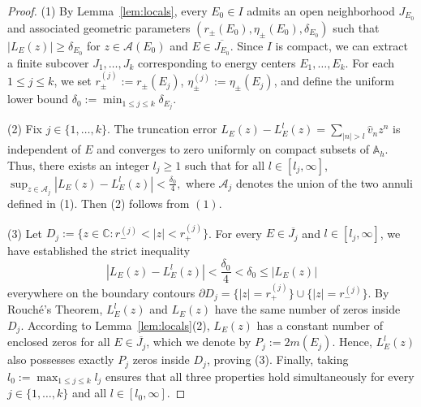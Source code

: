\documentclass[reqno,11pt]{amsart}
\begin{document}
\begin{proof}
(1) By Lemma~\ref{lem:locals}, every $E_0 \in I$ admits an open neighborhood $J_{E_0}$ and associated geometric parameters $(r_\pm(E_0), \eta_\pm(E_0), \delta_{E_0})$ such that $|L_{E}^{}(z)| \ge \delta_{E_0}$ for $z\in \mathcal A(E_0)$ and $E \in \overline{J_{E_0}}$. 
Since $I$ is compact, we can extract a finite subcover $J_1, \dots, J_k$ corresponding to energy centers $E_1, \dots, E_k$. For each $1 \le j \le k$, we set $r_\pm^{(j)} := r_\pm(E_j)$, $\eta_\pm^{(j)} := \eta_\pm(E_j)$, and define the uniform lower bound $\delta_0 := \min_{1 \le j \le k}\delta_{E_j}$. 

(2) Fix $j \in \{1,\dots,k\}$. The truncation error $L_{E}^{}(z) - L^{l}_E(z) = \sum_{|n|>l} \hat{v}_n z^n$ is  independent of $E$ and converges to zero uniformly on compact subsets of $\mathbb{A}_h$. Thus, there exists an integer $l_j \ge 1$ such that for all $l \in[l_j,\infty]$, 
$
\sup_{z \in \mathcal{A}_j} |L_{E}^{}(z) - L^{l}_{E}(z)| < \frac{\delta_0}{4},
$
where $\mathcal{A}_j$ denotes the union of the two annuli defined in (1). 
Then (2) follows  from $(1)$.


(3) Let $D_j := \{z \in \mathbb{C} : r_-^{(j)} < |z| < r_+^{(j)}\}$. For every $E \in \overline{J_j}$ and $l \in [l_j,\infty]$, we have established the strict inequality
$$
|L_{E}^{}(z) - L^{l}_{E}(z)| < \frac{\delta_0}{4} < \delta_0 \le |L_{E}^{}(z)|
$$
everywhere on the boundary contours $\partial D_j = \{|z|=r_+^{(j)}\} \cup \{|z|=r_-^{(j)}\}$. By Rouché's Theorem, $L^{l}_{E}(z)$ and $L_{E}^{}(z)$  have  the same number of zeros inside $D_j$. According to Lemma~\ref{lem:locals}(2), $L_{E}^{}(z)$ has a constant number of enclosed zeros for all $E \in \overline{J_j}$, which we denote by $P_j := 2m(E_j)$. Hence, $L^{l}_{E}(z)$ also possesses exactly $P_j$ zeros inside $D_j$, proving (3).
Finally, taking $l_0 := \max_{1\le j \le k} l_j$ ensures that all three properties hold simultaneously for every $j \in \{1, \dots, k\}$ and all $l\in[l_0,\infty]$.
\end{proof}
\end{document}
